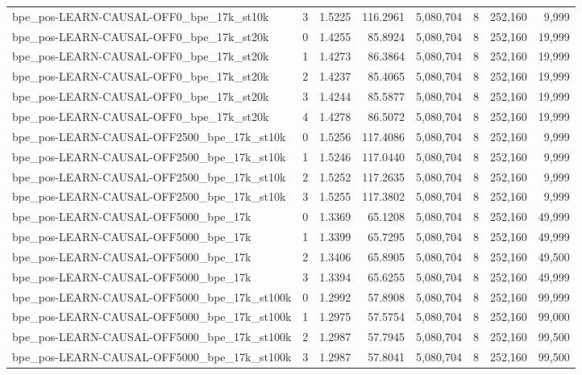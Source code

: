 \begin{tabular}{lrrrrrrr}
bpe\_pos-LEARN-CAUSAL-OFF0\_bpe\_17k\_st10k & 3 & 1.5225 & 116.2961 & 5,080,704 & 8 & 252,160 & 9,999 \\
bpe\_pos-LEARN-CAUSAL-OFF0\_bpe\_17k\_st20k & 0 & 1.4255 & 85.8924 & 5,080,704 & 8 & 252,160 & 19,999 \\
bpe\_pos-LEARN-CAUSAL-OFF0\_bpe\_17k\_st20k & 1 & 1.4273 & 86.3864 & 5,080,704 & 8 & 252,160 & 19,999 \\
bpe\_pos-LEARN-CAUSAL-OFF0\_bpe\_17k\_st20k & 2 & 1.4237 & 85.4065 & 5,080,704 & 8 & 252,160 & 19,999 \\
bpe\_pos-LEARN-CAUSAL-OFF0\_bpe\_17k\_st20k & 3 & 1.4244 & 85.5877 & 5,080,704 & 8 & 252,160 & 19,999 \\
bpe\_pos-LEARN-CAUSAL-OFF0\_bpe\_17k\_st20k & 4 & 1.4278 & 86.5072 & 5,080,704 & 8 & 252,160 & 19,999 \\
bpe\_pos-LEARN-CAUSAL-OFF2500\_bpe\_17k\_st10k & 0 & 1.5256 & 117.4086 & 5,080,704 & 8 & 252,160 & 9,999 \\
bpe\_pos-LEARN-CAUSAL-OFF2500\_bpe\_17k\_st10k & 1 & 1.5246 & 117.0440 & 5,080,704 & 8 & 252,160 & 9,999 \\
bpe\_pos-LEARN-CAUSAL-OFF2500\_bpe\_17k\_st10k & 2 & 1.5252 & 117.2635 & 5,080,704 & 8 & 252,160 & 9,999 \\
bpe\_pos-LEARN-CAUSAL-OFF2500\_bpe\_17k\_st10k & 3 & 1.5255 & 117.3802 & 5,080,704 & 8 & 252,160 & 9,999 \\
bpe\_pos-LEARN-CAUSAL-OFF5000\_bpe\_17k & 0 & 1.3369 & 65.1208 & 5,080,704 & 8 & 252,160 & 49,999 \\
bpe\_pos-LEARN-CAUSAL-OFF5000\_bpe\_17k & 1 & 1.3399 & 65.7295 & 5,080,704 & 8 & 252,160 & 49,999 \\
bpe\_pos-LEARN-CAUSAL-OFF5000\_bpe\_17k & 2 & 1.3406 & 65.8905 & 5,080,704 & 8 & 252,160 & 49,500 \\
bpe\_pos-LEARN-CAUSAL-OFF5000\_bpe\_17k & 3 & 1.3394 & 65.6255 & 5,080,704 & 8 & 252,160 & 49,999 \\
bpe\_pos-LEARN-CAUSAL-OFF5000\_bpe\_17k\_st100k & 0 & 1.2992 & 57.8908 & 5,080,704 & 8 & 252,160 & 99,999 \\
bpe\_pos-LEARN-CAUSAL-OFF5000\_bpe\_17k\_st100k & 1 & 1.2975 & 57.5754 & 5,080,704 & 8 & 252,160 & 99,000 \\
bpe\_pos-LEARN-CAUSAL-OFF5000\_bpe\_17k\_st100k & 2 & 1.2987 & 57.7945 & 5,080,704 & 8 & 252,160 & 99,500 \\
bpe\_pos-LEARN-CAUSAL-OFF5000\_bpe\_17k\_st100k & 3 & 1.2987 & 57.8041 & 5,080,704 & 8 & 252,160 & 99,500 \\

\end{tabular}
